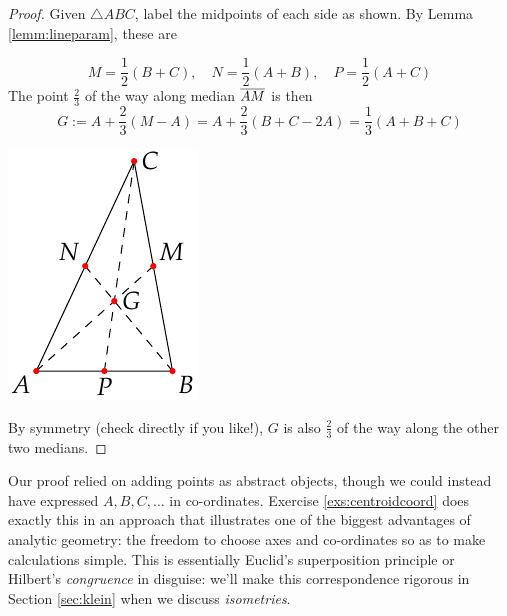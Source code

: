 \begin{proof}
	Given $\triangle ABC$, label the midpoints of each side as shown. By Lemma \ref{lemm:lineparam}, these are\par
	\begin{minipage}[t]{0.7\linewidth}\vspace{-8pt}
		\[
			M=\frac 12(B+C),\quad N=\frac 12(A+B),\quad P=\frac 12(A+C)
		\]
		The point $\frac 23$ of the way along median $\overline{AM}$ is then
		\[
			G:=A+\frac 23(M-A)=A+\frac 23(B+C-2A)=\frac 13(A+B+C)
		\]
	\end{minipage}
	\hfill
	\begin{minipage}[t]{0.29\linewidth}\vspace{-23pt}
		\flushright\includegraphics[scale=0.95]{analytic-centroid}
	\end{minipage}\medbreak
		By symmetry (check directly if you like!), $G$ is also $\frac 23$ of the way along the other two medians.
\end{proof}

Our proof relied on adding points as abstract objects, though we could instead have expressed $A,B,C,\ldots$ in co-ordinates. Exercise \ref{exs:centroidcoord} does exactly this in an approach that illustrates one of the biggest advantages of analytic geometry: the freedom to choose axes and co-ordinates so as to make calculations simple. This is essentially Euclid's superposition principle or Hilbert's \emph{congruence} in disguise: we'll make this correspondence rigorous in Section \ref{sec:klein} when we discuss \emph{isometries}.


